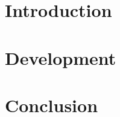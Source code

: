 \documentclass[journal]{IEEEtran}
\begin{document}


\maketitle

%   


%
\IEEEpeerreviewmaketitle{}

\section{Introduction}


\section{Development}


\section{Conclusion}


\end{document}
